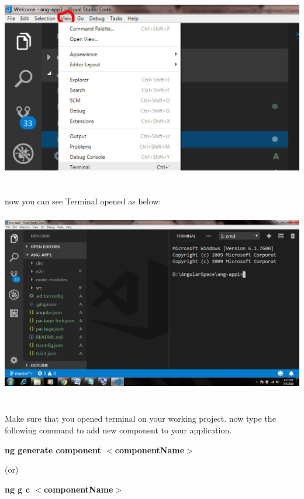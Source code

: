 \documentclass{article}
\begin{document}
	\noindent \includegraphics*[width=5.41in, height=3.04in]{IMG-02-04}


\noindent 

\noindent \\ now you can see Terminal opened as below:

	\noindent \includegraphics*[width=5.55in, height=3.12in]{IMG-02-05}

\newpage
\noindent \\ Make sure that you opened terminal on your working project. now type the following command to add new component to your application.

\noindent \textbf{ng generate component $\boldsymbol{\mathrm{<}}$componentName$\boldsymbol{\mathrm{>}}$}

 (or)

\noindent \textbf{ng g c $\boldsymbol{\mathrm{<}}$componentName$\boldsymbol{\mathrm{>}}$}

\noindent 
\end{document}
